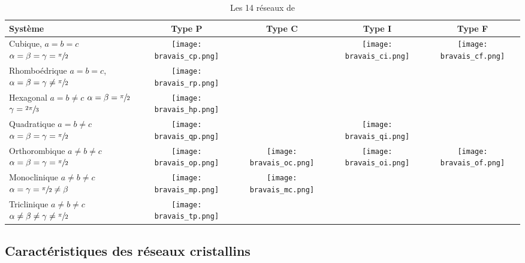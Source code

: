 \begin{table}
    \footnotesize
    \begin{tabulary}{\linewidth}{|p{2.5cm}|c|c|c|c|}
        \hline \bf Système & Type P & Type C & Type I & Type F \\\hline
        Cubique, \mbox{$a = b = c$}
        \mbox{$\alpha = \beta = \gamma = \sfrac{\pi}{2}$} &
        \texttt{[image: bravais\_cp.png]} & & 
        \texttt{[image: bravais\_ci.png]} &
        \texttt{[image: bravais\_cf.png]} 
        \\
        \hline Rhomboédrique $a = b = c$,
        \mbox{$\alpha = \beta = \gamma \neq \sfrac{\pi}{2}$}&
        \texttt{[image: bravais\_rp.png]} & & &
        \\
        \hline Hexagonal $a = b \neq c$
        \mbox{$\alpha = \beta = \sfrac{\pi}{2}$} $\gamma = \sfrac{2\pi}{3}$ &
        \texttt{[image: bravais\_hp.png]} & & &
        \\
        \hline Quadratique $a = b \neq c$
        \mbox{$\alpha = \beta = \gamma = \sfrac{\pi}{2}$} &
        \texttt{[image: bravais\_qp.png]} & &
        \texttt{[image: bravais\_qi.png]} &
        \\
        \hline Orthorombique $a \neq b \neq c$
        \mbox{$\alpha = \beta = \gamma = \sfrac{\pi}{2}$} &
        \texttt{[image: bravais\_op.png]} &
        \texttt{[image: bravais\_oc.png]} &
        \texttt{[image: bravais\_oi.png]} &
        \texttt{[image: bravais\_of.png]}
        \\
        \hline Monoclinique $a \neq b \neq c$
        \mbox{$\alpha=\gamma=\sfrac{\pi}{2} \neq \beta$}
        &
        \texttt{[image: bravais\_mp.png]} &
        \texttt{[image: bravais\_mc.png]} & &
        \\
        \hline Triclinique $a \neq b \neq c$
        \mbox{$\alpha \neq \beta \neq \gamma \neq \sfrac{\pi}{2}$} &
        \texttt{[image: bravais\_tp.png]} & & &
        \\
        \hline
    \end{tabulary}
    \caption{Les 14 réseaux de }\label{tab:bravais}
\end{table}

\subsection{Caractéristiques des réseaux cristallins}
